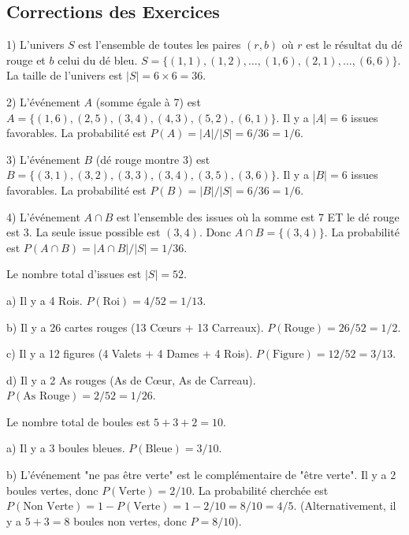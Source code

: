 
\subsection{Corrections des Exercices}


\begin{correctionbox}
1) L'univers $S$ est l'ensemble de toutes les paires $(r, b)$ où $r$ est le résultat du dé rouge et $b$ celui du dé bleu. $S = \{ (1,1), (1,2), \dots, (1,6), (2,1), \dots, (6,6) \}$. La taille de l'univers est $|S| = 6 \times 6 = 36$.

2) L'événement $A$ (somme égale à 7) est $A = \{ (1,6), (2,5), (3,4), (4,3), (5,2), (6,1) \}$. Il y a $|A|=6$ issues favorables. La probabilité est $P(A) = |A|/|S| = 6/36 = 1/6$.

3) L'événement $B$ (dé rouge montre 3) est $B = \{ (3,1), (3,2), (3,3), (3,4), (3,5), (3,6) \}$. Il y a $|B|=6$ issues favorables. La probabilité est $P(B) = |B|/|S| = 6/36 = 1/6$.

4) L'événement $A \cap B$ est l'ensemble des issues où la somme est 7 ET le dé rouge est 3. La seule issue possible est $(3,4)$. Donc $A \cap B = \{ (3,4) \}$. La probabilité est $P(A \cap B) = |A \cap B|/|S| = 1/36$.
\end{correctionbox}

\begin{correctionbox}
Le nombre total d'issues est $|S| = 52$.

a) Il y a 4 Rois. $P(\text{Roi}) = 4/52 = 1/13$.

b) Il y a 26 cartes rouges (13 Cœurs + 13 Carreaux). $P(\text{Rouge}) = 26/52 = 1/2$.

c) Il y a 12 figures (4 Valets + 4 Dames + 4 Rois). $P(\text{Figure}) = 12/52 = 3/13$.

d) Il y a 2 As rouges (As de Cœur, As de Carreau). $P(\text{As Rouge}) = 2/52 = 1/26$.
\end{correctionbox}

\begin{correctionbox}
Le nombre total de boules est $5+3+2 = 10$.

a) Il y a 3 boules bleues. $P(\text{Bleue}) = 3/10$.

b) L'événement "ne pas être verte" est le complémentaire de "être verte". Il y a 2 boules vertes, donc $P(\text{Verte}) = 2/10$. La probabilité cherchée est $P(\text{Non Verte}) = 1 - P(\text{Verte}) = 1 - 2/10 = 8/10 = 4/5$. (Alternativement, il y a $5+3=8$ boules non vertes, donc $P=8/10$).
\end{correctionbox}

